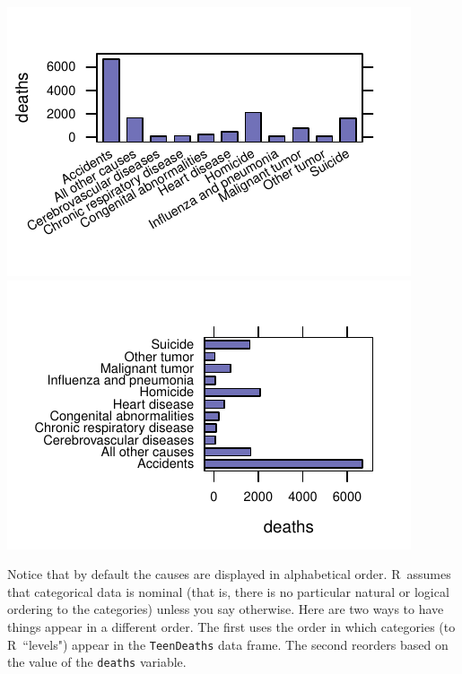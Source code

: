 \documentclass[twoside]{book}\usepackage[]{graphicx}\usepackage[]{xcolor}
\makeatletter
\def\maxwidth{ %
  \ifdim\Gin@nat@width>\linewidth
    \linewidth
  \else
    \Gin@nat@width
  \fi
}
\newenvironment{knitrout}{}{} %
\newcommand{\variable}[1]{{\color{green!50!black}\texttt{#1}}}
\newcommand{\Rindex}[1]{\index{\texttt{#1}}}
\newcommand{\dataframe}[1]{{\color{blue!80!black}\texttt{#1}}\Rindex{#1}}
\def\R{{\sf R}}
\makeatother
\begin{document}
\begin{knitrout}
{\centering \includegraphics[width=\maxwidth]{figures/fig-teen-deaths-1} 
\includegraphics[width=\maxwidth]{figures/fig-teen-deaths-2} 

}



\end{knitrout}
Notice that by default the causes are displayed in alphabetical order.  \R\
assumes that categorical data is nominal (that is, there is no particular natural or logical ordering to the categories) unless you say otherwise.  
Here are two ways to have things appear in a different order. The first uses 
the order in which categories (to \R\, ``levels") appear in the \dataframe{TeenDeaths} data frame.
The second reorders based on the value of the \variable{deaths} variable.
\end{document}
